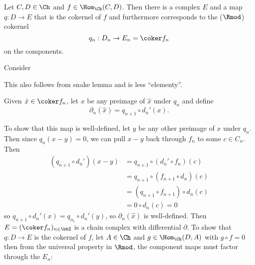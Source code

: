 \documentclass[12pt]{article}
\begin{document}
\begin{sol}
	\brk
	\begin{lem}\label{lem-chain-coker}
		Let $C,D\in\Ch$ and $f\in\Hom_{\Ch}(C,D)$. Then there is a complex $E$ and a map $q:D\to E$ 
		that is the cokernel of $f$ and furthermore corresponds to the ($\Rmod$) cokernel 
		\[q_n:D_n\to E_n=\coker f_n\]
		on the components.
	\end{lem}
	\begin{prf}
	Consider
	
	\begin{center}
	\end{center}

	\begin{rmk}
		This also follows from snake lemma and is less ``elementy''.
	\end{rmk}
	Given $\hat x\in\coker f_n$, let $x$ be any preimage of $\hat x$ under $q_n$ and define
	\[\partial_n(\hat x)=q_{n+1}\circ d_n'(x).\]

	To show that this map is well-defined, let $y$ be any other preimage of $x$ under $q_n$.
	Then since $q_n(x-y)=0$, we can pull $x-y$ back through $f_n$ to some $c\in C_n$. Then
	\begin{align*}
		(q_{n+1}\circ d_n')(x-y)&=q_{n+1}\circ (d_n'\circ f_n)(c)\\
		&=q_{n+1}\circ(f_{n+1}\circ d_n)(c)\\
		&=(q_{n+1}\circ f_{n+1})\circ d_n(c)\\
		&=0\circ d_n(c)=0
	\end{align*}
	so $q_{n+1}\circ d_n'(x)=q_{n_1}\circ d_n'(y)$, so $\partial_n(\hat x)$ is well-defined. Then 
	$E=(\coker f_n)_{n\in\bbZ}$ is a chain complex with differential $\partial$. To show that $q:D\to E$ 
	is the cokernel of $f$, let $A\in\Ch$ and $g\in\Hom_{\Ch}(D,A)$  with $g\circ f = 0$ then from the universal property in 
	$\Rmod$, the component maps must factor through the $E_n$:

	\begin{center}
	\end{center}


\end{prf}
\end{sol}
\end{document}
